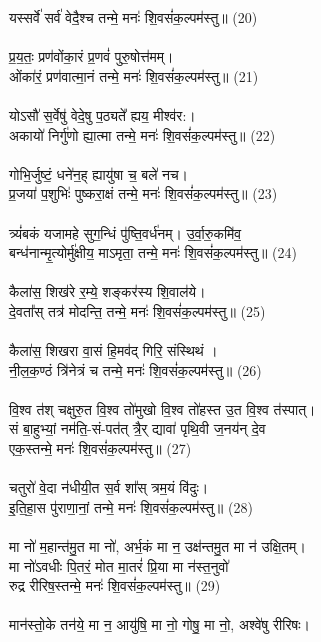 {यस्सर्वे॑ सर्व॑ वेदै॒श्च तन्मे॒ मनः॑ शि॒वसं॑क॒ल्पम॑स्तु॥ (20)\\
\\
प्र॒य॒तः॒ प्रण॑वोंका॒रं प्र॒णवं॑ पुरु॒षोत्त॑मम्। \\
ओंका॑रं॒ प्रण॑वात्मा॒नं तन्मे॒ मनः॑ शि॒वसं॑क॒ल्पम॑स्तु॥ (21)\\
\\
योऽसौ॑ स॒र्वेषु॑ वेदे॒षु प॒ठ्यते᳚ ह्यय॒ मीश्व॑र:। \\
अकायो॑ निर्गु॑णो ह्या॒त्मा तन्मे॒ मनः॑ शि॒वसं॑क॒ल्पम॑स्तु॥ (22)\\
\\
गोभि॒र्जुष्टं॒ धने॑न॒ह् ह्यायु॑षा च॒ बले॑ नच। \\
प्र॒जया॑ प॒शुभिः॑ पुष्करा॒क्षं तन्मे॒ मनः॑ शि॒वसं॑क॒ल्पम॑स्तु॥ (23)\\
\\
त्र्यं॑बकं यजामहे सुग॒न्धिं पु॑ष्ति॒वर्ध॑नम्। उ॒र्वा॒रु॒कमि॑व॒ \\
बन्ध॑नान्मृ॒त्योर्मु॑क्षीय॒ माऽमृता॒ तन्मे॒ मनः॑ शि॒वसं॑क॒ल्पम॑स्तु॥ (24)\\
\\
कैला॑स॒ शिख॑रे र॒म्ये॒ शङ्कर॑स्य शि॒वाल॑ये। \\
दे॒वता᳚स् तत्र॑ मोदन्ति॒ तन्मे॒ मनः॑ शि॒वसं॑क॒ल्पम॑स्तु॥ (25)\\
\\
कैला॑स॒ शिखरा वा॒सं हि॒मव॑द् गिरि॒ संस्थिथं । \\
नी॒ल॒क॒ण्ठं त्रि॑नेत्रं च तन्मे॒ मनः॑ शि॒वसं॑क॒ल्पम॑स्तु॥ (26)\\
\\
वि॒श्व त॑श् चक्षुरु॒त वि॒श्व तो॑मुखो वि॒श्व तो॑हस्त उ॒त वि॒श्व त॑स्पात्।\\
सं बा॒हुभ्यां॒ नम॑ति॒-सं-पत॑त् त्रै॒र् द्यावा॑ पृथि॒वी ज॒नय॑न् दे॒व\\
 एक॒स्तन्मे॒ मनः॑ शि॒वसं॑क॒ल्पम॑स्तु॥ (27)\\
\\
चतुरो॑ वे॒दा न॑धीयी॒त स॒र्व शा᳚स् त्रम॒यं वि॑दुः।  \\
इ॒ति॒हा॒स पु॑राणा॒नां॒ तन्मे॒ मनः॑ शि॒वसं॑क॒ल्पम॑स्तु॥ (28)\\
\\
मा नो॑ म॒हान्त॑मु॒त मा नो॑, अर्भ॒कं मा न॒ उक्ष॑न्तमु॒त मा न॑ उक्षि॒तम्। \\
मा नो॑ऽवधीः पि॒तरं॒ मोत मा॒तरं॑ प्रि॒या मा न॑स्त॒नुवो॑ \\
रुद्र रीरिष॒स्तन्मे॒ मनः॑ शि॒वसं॑क॒ल्पम॑स्तु॥  (29)\\
\\
मान॑स्तो॒के तन॑ये॒ मा न॒ आयु॑षि॒ मा नो॒ गोषु॒ मा नो॒, अश्वे॑षु रीरिषः। \\
}

